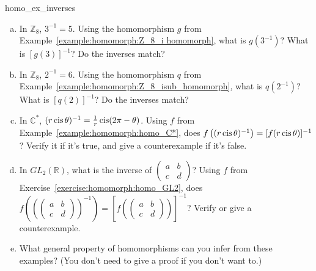 \begin{exercise}{homo_ex_inverses}
\begin{enumerate}[(a)]
\item
In ${\mathbb Z}_8$, $3^{-1} = 5$.  Using the homomorphism $g$ from Example~\ref{example:homomorph:Z_8_i homomorph}, what is $g(3^{-1})$?  What is $[g(3)]^{-1}$? Do the inverses match?
\item
In ${\mathbb Z}_8$, $2^{-1} = 6$.  Using the homomorphism $q$ from Example~\ref{example:homomorph:Z_8_isub_homomorph}, what is $q(2^{-1})$?  What is $[q(2)]^{-1}$? Do the inverses match?
\item
In  ${\mathbb C}^\ast$, $(r \operatorname{cis} \theta)^{-1} = \frac{1}{r} \operatorname{cis} (2\pi - \theta)$.  Using $f$ from Example~\ref{example:homomorph:homo_C*},  does $f\left((r \operatorname{cis} \theta)^{-1}\right) = [f(r \operatorname{cis} \theta)]^{-1}$? Verify it if it's true, and give a counterexample if it's false.
\item
In $GL_2( {\mathbb R })$, what is the inverse of
$\begin{pmatrix}
a & b \\
c & d
\end{pmatrix}$?
Using $f$ from Exercise~\ref{exercise:homomorph:homo_GL2}, does $f\left((\begin{pmatrix} a & b \\ c & d \end{pmatrix})^{-1}\right) = [f(\begin{pmatrix} a & b \\ c & d \end{pmatrix})]^{-1}$?  Verify or give a counterexample.
\item
What general property of homomorphisms can you infer from these examples? (You don't need to give a proof if you don't want to.)
\end{enumerate}
\end{exercise}






 

 

